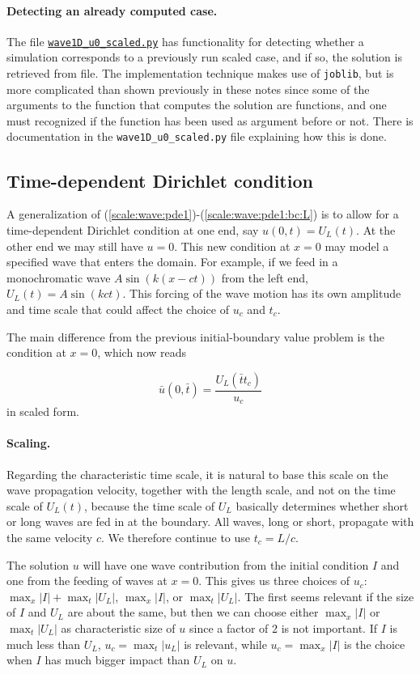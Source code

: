 \documentclass[graybox,envcountchap,sectrefs,final]{svmonodo}
\begin{document}
\paragraph{Detecting an already computed case.}
The file \href{{http://tinyurl.com/o8pb3yy/wave1D_u0_scaled.py}}{\nolinkurl{wave1D_u0_scaled.py}}
has functionality for detecting whether a simulation corresponds to
a previously run scaled case, and if so, the solution is retrieved from
file. The implementation technique makes use of \texttt{joblib}, but is more
complicated than shown previously in these notes since some of the
arguments to the function that computes the solution are functions,
and one must recognized if the function has been used as argument
before or not. There is documentation in the \Verb!wave1D_u0_scaled.py!
file explaining how this is done.


\subsection{Time-dependent Dirichlet condition}
\label{scale:wave:pde2}

A generalization of (\ref{scale:wave:pde1})-(\ref{scale:wave:pde1:bc:L})
is to allow for a time-dependent Dirichlet condition at one end, say
$u(0,t)=U_L(t)$. At the other end we may still have $u=0$.  This new
condition at $x=0$ may model a specified wave that enters the
domain. For example, if we feed in a monochromatic wave
$A\sin(k(x-ct))$ from the left end, $U_L(t)=A\sin (kct)$.  This
forcing of the wave motion has its own amplitude and time scale that
could affect the choice of $u_c$ and $t_c$.

The main difference from the previous initial-boundary value problem
is the condition at $x=0$, which now reads

\[ \bar u(0,\bar t) = \frac{U_L(\bar t t_c)}{u_c}\]
in scaled form.

\paragraph{Scaling.}
Regarding the characteristic time scale, it is natural to base this
scale on the wave propagation velocity, together with the length
scale, and not on the time scale of $U_L(t)$, because the time scale
of $U_L$ basically determines whether short or long waves are fed in
at the boundary. All waves, long or short, propagate with the same
velocity $c$. We therefore continue to use $t_c=L/c$.

The solution $u$ will have one wave contribution from the initial
condition $I$ and one from the feeding of waves at $x=0$. This gives
us three choices of $u_c$: $\max_x |I| + \max_t |U_L|$, $\max_x |I|$,
or $\max_t |U_L|$. The first seems relevant if the size of $I$ and
$U_L$ are about the same, but then we can choose either $\max_x |I|$
or $\max_t |U_L|$ as characteristic size of $u$ since a factor of 2 is
not important. If $I$ is much less than $U_L$, $u_c=\max_t |u_L|$ is
relevant, while $u_c=\max_x|I|$ is the choice when $I$ has much bigger
impact than $U_L$ on $u$.
\end{document}

